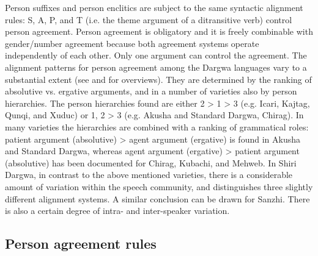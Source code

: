 Person suffixes and person enclitics are subject to the same syntactic alignment rules: S, A, P, and T (i.e. the theme argument of a ditransitive verb) control person agreement. Person agreement is obligatory and it is freely combinable with gender/number agreement because both agreement systems operate independently of each other. Only one argument can control the agreement. The alignment patterns for person agreement among the Dargwa languages vary to a substantial extent (see \citealp{Sumbatova2011} and  for overviews). They are determined by the ranking of absolutive vs. ergative arguments, and in a number of varieties also by person hierarchies. The person hierarchies found are either 2 > 1 > 3 (e.g. Icari, Kajtag, Qunqi, and Xuduc) or 1, 2 > 3 (e.g. Akusha and Standard Dargwa, Chirag). In many varieties the hierarchies are combined with a ranking of grammatical roles: patient argument (absolutive) > agent argument (ergative) is found in Akusha and Standard Dargwa, whereas agent argument (ergative) > patient argument (absolutive) has been documented for Chirag, Kubachi, and Mehweb. In Shiri Dargwa, in contrast to the above mentioned varieties, there is a considerable amount of variation within the speech community, and \citet{Belyaev2013} distinguishes three slightly different alignment systems. A similar conclusion can be drawn for Sanzhi. There is also a certain degree of intra- and inter-speaker variation.



\subsection{Person agreement rules}
\label{ssec:Person agreement rules}

